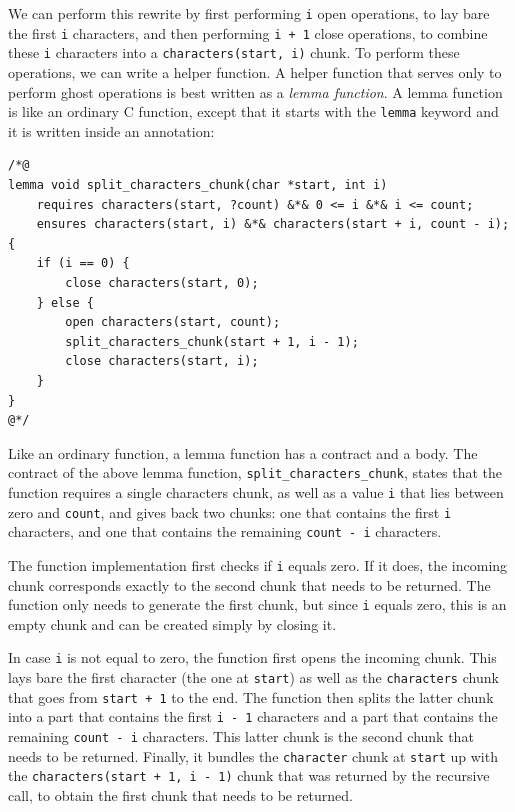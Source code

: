 \documentclass{article}
\begin{document}
We can perform this rewrite by first performing \lstinline!i! open operations, to lay bare the first \lstinline!i! characters,
and then performing \lstinline!i + 1! close operations, to combine these \lstinline!i! characters into a \lstinline!characters(start, i)! chunk.
To perform these operations, we can write a helper function. A helper function that serves only to perform ghost operations is best written as a
\emph{lemma function}. A lemma function is like an ordinary C function, except that it starts with the \lstinline!lemma! keyword and it is written
inside an annotation:
\begin{lstlisting}
/*@
lemma void split_characters_chunk(char *start, int i)
    requires characters(start, ?count) &*& 0 <= i &*& i <= count;
    ensures characters(start, i) &*& characters(start + i, count - i);
{
    if (i == 0) {
        close characters(start, 0);
    } else {
        open characters(start, count);
        split_characters_chunk(start + 1, i - 1);
        close characters(start, i);
    }
}
@*/
\end{lstlisting}
Like an ordinary function, a lemma function has a contract and a body. The contract of the above lemma function, \lstinline!split_characters_chunk!,
states that the function requires a single characters chunk, as well as a value \lstinline!i! that lies between zero and \lstinline!count!, and
gives back two chunks: one that contains the first \lstinline!i! characters, and one that contains the remaining \lstinline!count - i! characters.

The function implementation first checks if \lstinline!i! equals zero. If it does, the incoming chunk corresponds exactly to the second chunk that needs to be
returned. The function only needs to generate the first chunk, but since \lstinline!i! equals zero, this is an empty chunk and can be created simply by
closing it.

In case \lstinline!i! is not equal to zero, the function first opens the incoming chunk. This lays bare the first character (the one at \lstinline!start!) as
well as the \lstinline!characters! chunk that goes from \lstinline!start + 1! to the end. The function then splits the latter chunk into a part that contains
the first \lstinline!i - 1! characters and a part that contains the remaining \lstinline!count - i! characters. This latter chunk is the second chunk that needs
to be returned. Finally, it bundles the \lstinline!character!
chunk at \lstinline!start! up with the \lstinline!characters(start + 1, i - 1)! chunk that was returned by the recursive call, to obtain the first chunk
that needs to be returned.
\end{document}
